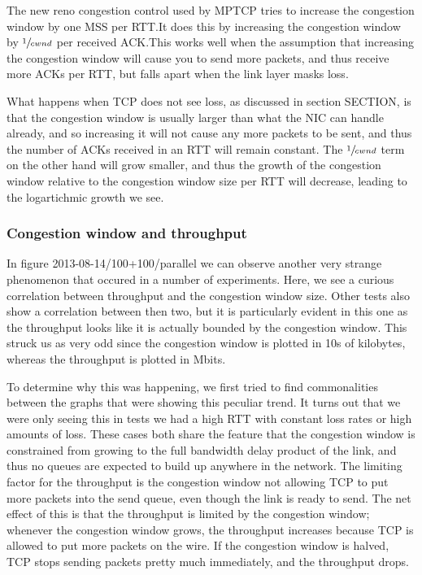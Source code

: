 \documentclass[12pt,a4paper]{article}
\begin{document}
The new reno congestion control used by MPTCP tries to increase the congestion
window by one MSS per RTT.\@ It does this by increasing the congestion window by
$\sfrac{1}{cwnd}$ per received ACK.\@ This works well when the assumption that
increasing the congestion window will cause you to send more packets, and thus
receive more ACKs per RTT, but falls apart when the link layer masks loss.

What happens when TCP does not see loss, as discussed in section SECTION, is   %
that the congestion window is usually larger than what the NIC can handle
already, and so increasing it will not cause any more packets to be sent, and
thus the number of ACKs received in an RTT will remain constant. The
$\sfrac{1}{cwnd}$ term on the other hand will grow smaller, and thus the growth
of the congestion window relative to the congestion window size per RTT will
decrease, leading to the logartichmic growth we see.

\subsubsection{Congestion window and throughput}
In figure 2013-08-14/100+100/parallel we can observe another very strange      %
phenomenon that occured in a number of experiments. Here, we see a curious
correlation between throughput and the congestion window size. Other tests also
show a correlation between then two, but it is particularly evident in this one
as the throughput looks like it is actually bounded by the congestion window.
This struck us as very odd since the congestion window is plotted in 10s of
kilobytes, whereas the throughput is plotted in Mbits.

To determine why this was happening, we first tried to find commonalities
between the graphs that were showing this peculiar trend. It turns out that we
were only seeing this in tests we had a high RTT with constant loss rates or
high amounts of loss. These cases both share the feature that the congestion
window is constrained from growing to the full bandwidth delay product of the
link, and thus no queues are expected to build up anywhere in the network. The
limiting factor for the throughput is the congestion window not allowing TCP to
put more packets into the send queue, even though the link is ready to send. The
net effect of this is that the throughput is limited by the congestion window;
whenever the congestion window grows, the throughput increases because TCP is
allowed to put more packets on the wire. If the congestion window is halved, TCP
stops sending packets pretty much immediately, and the throughput drops.
\end{document}
